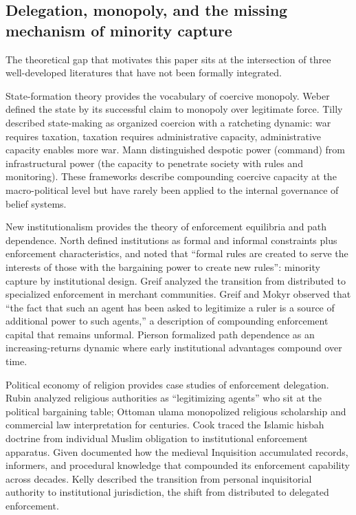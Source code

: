 \documentclass[12pt]{article}
\begin{document}
\subsection{Delegation, monopoly, and the missing mechanism of minority capture}

The theoretical gap that motivates this paper sits at the intersection of three well-developed literatures that have not been formally integrated.

State-formation theory provides the vocabulary of coercive monopoly. Weber \cite{weber1946} defined the state by its successful claim to monopoly over legitimate force. Tilly \cite{tilly1985} described state-making as organized coercion with a ratcheting dynamic: war requires taxation, taxation requires administrative capacity, administrative capacity enables more war. Mann \cite{mann1986} distinguished despotic power (command) from infrastructural power (the capacity to penetrate society with rules and monitoring). These frameworks describe compounding coercive capacity at the macro-political level but have rarely been applied to the internal governance of belief systems.

New institutionalism provides the theory of enforcement equilibria and path dependence. North \cite{north1990} defined institutions as formal and informal constraints plus enforcement characteristics, and noted that ``formal rules are created to serve the interests of those with the bargaining power to create new rules'': minority capture by institutional design. Greif \cite{greif2006} analyzed the transition from distributed to specialized enforcement in merchant communities. Greif and Mokyr \cite{greif2016} observed that ``the fact that such an agent has been asked to legitimize a ruler is a source of additional power to such agents,'' a description of compounding enforcement capital that remains unformal. Pierson \cite{pierson2000} formalized path dependence as an increasing-returns dynamic where early institutional advantages compound over time.

Political economy of religion provides case studies of enforcement delegation. Rubin \cite{rubin2017} analyzed religious authorities as ``legitimizing agents'' who sit at the political bargaining table; Ottoman ulama monopolized religious scholarship and commercial law interpretation for centuries. Cook \cite{cook2000} traced the Islamic hisbah doctrine from individual Muslim obligation to institutional enforcement apparatus. Given \cite{given1997} documented how the medieval Inquisition accumulated records, informers, and procedural knowledge that compounded its enforcement capability across decades. Kelly \cite{kelly1989} described the transition from personal inquisitorial authority to institutional jurisdiction, the shift from distributed to delegated enforcement.
\end{document}
